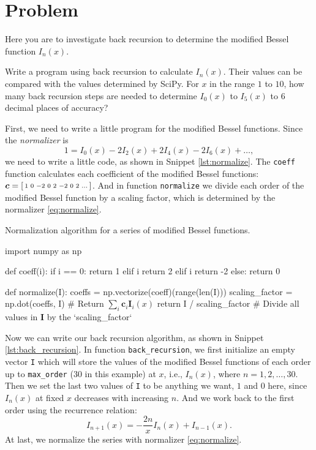 \section{Problem \thesection}

Here you are to investigate back recursion to determine the modified Bessel function
$I_n(x)$.

\Question Write a program using back recursion to calculate $I_n(x)$.
Their values can be compared with the values determined by SciPy.
For $x$ in the range $1$ to $10$, how many back recursion steps are needed to
determine $I_0(x)$ to $I_5(x)$ to $6$ decimal places of accuracy?

\Answer First, we need to write a little program for the modified Bessel functions.
Since the \emph{normalizer} is
%
\begin{equation}\label{eq:normalize}
    1 = I_0(x) - 2 I_2(x) + 2 I_4(x) - 2 I_6(x) + \ldots,
\end{equation}
%
we need to write a little code, as shown in Snippet \ref{lst:normalize}.
The \texttt{coeff} function calculates each coefficient of the
modified Bessel functions: $\bm{c} = \begin{bsmallmatrix}1 & 0 & -2 & 0 & 2 & -2 & 0 & 2 & \ldots\end{bsmallmatrix}$.
And in function \texttt{normalize} we divide each order of the modified Bessel function
by a scaling factor, which is determined by the normalizer \eqref{eq:normalize}.

\begin{algorithm}
    \caption{Normalization algorithm for a series of modified Bessel functions.}
    \label{lst:normalize}
    \begin{pythoncode}
        import numpy as np


        def coeff(i):
            if i == 0:
                return 1
            elif i %
                return 2
            elif i %
                return -2
            else:
                return 0


        def normalize(I):
            coeffs = np.vectorize(coeff)(range(len(I)))
            scaling_factor = np.dot(coeffs, I)  # Return $\sum_i \bm{c}_i \bm{I}_i(x)$
            return I / scaling_factor  # Divide all values in $\bm{I}$ by the `scaling_factor`
    \end{pythoncode}
\end{algorithm}

Now we can write our back recursion algorithm, as shown in Snippet \ref{lst:back_recursion}.
In function \texttt{back\_recursion}, we first initialize an empty vector \texttt{I} which
will store the values of the modified Bessel functions of each order up to
\texttt{max\_order} ($30$ in this example) at $x$, i.e., $I_n(x)$, where
$n = 1, 2, \ldots, 30$.
Then we set the last two values of \texttt{I} to be anything we want, $1$ and $0$ here,
since $I_n(x)$ at fixed $x$ decreases with increasing $n$.
And we work back to the first order using the recurrence relation:
%
\begin{equation}
    I_{n + 1}(x) = -\frac{ 2 n }{ x } I_n(x) + I_{n - 1}(x).
\end{equation}
%
At last, we normalize the series with normalizer \eqref{eq:normalize}.

